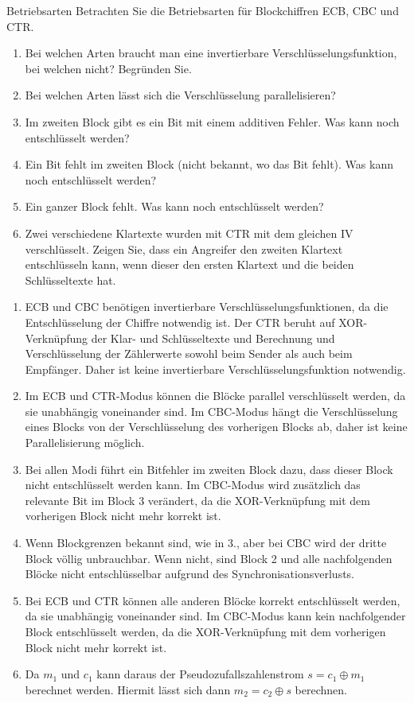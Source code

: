 \documentclass{article}
\begin{document}
\begin{exercise}{Betriebsarten}
  Betrachten Sie die Betriebsarten für Blockchiffren ECB, CBC und CTR.

  \begin{enumerate}
    \item Bei welchen Arten braucht man eine invertierbare Verschlüsselungsfunktion, bei welchen nicht? Begründen Sie.
    \item Bei welchen Arten lässt sich die Verschlüsselung parallelisieren?
    \item Im zweiten Block gibt es ein Bit mit einem additiven Fehler. Was kann noch entschlüsselt werden?
    \item Ein Bit fehlt im zweiten Block (nicht bekannt, wo das Bit fehlt). Was kann noch entschlüsselt werden?
    \item Ein ganzer Block fehlt. Was kann noch entschlüsselt werden?
    \item Zwei verschiedene Klartexte wurden mit CTR mit dem gleichen IV verschlüsselt. Zeigen Sie, dass ein Angreifer den zweiten Klartext entschlüsseln kann, wenn dieser den ersten Klartext und die beiden Schlüsseltexte hat.
  \end{enumerate}

  \begin{solution}
    \begin{enumerate}
        \item ECB und CBC benötigen invertierbare Verschlüsselungsfunktionen, da die Entschlüsselung der Chiffre notwendig ist. Der CTR beruht auf XOR-Verknüpfung der Klar- und Schlüsseltexte und Berechnung und Verschlüsselung der Zählerwerte sowohl beim Sender als auch beim Empfänger. Daher ist keine invertierbare Verschlüsselungsfunktion notwendig.
        \item Im ECB und CTR-Modus können die Blöcke parallel verschlüsselt werden, da sie unabhängig voneinander sind. Im CBC-Modus hängt die Verschlüsselung eines Blocks von der Verschlüsselung des vorherigen Blocks ab, daher ist keine Parallelisierung möglich.
        \item Bei allen Modi führt ein Bitfehler im zweiten Block dazu, dass dieser Block nicht entschlüsselt werden kann. Im CBC-Modus wird zusätzlich das relevante Bit im Block 3 verändert, da die XOR-Verknüpfung mit dem vorherigen Block nicht mehr korrekt ist.
        \item Wenn Blockgrenzen bekannt sind, wie in 3., aber bei CBC wird der dritte Block völlig unbrauchbar. Wenn nicht, sind Block 2 und alle nachfolgenden Blöcke nicht entschlüsselbar aufgrund des Synchronisationsverlusts.
        \item Bei ECB und CTR können alle anderen Blöcke korrekt entschlüsselt werden, da sie unabhängig voneinander sind. Im CBC-Modus kann kein nachfolgender Block entschlüsselt werden, da die XOR-Verknüpfung mit dem vorherigen Block nicht mehr korrekt ist.
        \item Da $m_1$ und $c_1$ kann daraus der Pseudozufallszahlenstrom $s=c_1\oplus m_1$ berechnet werden. Hiermit lässt sich dann $m_2=c_2\oplus s$ berechnen.
    \end{enumerate}
  \end{solution}
\end{exercise}
\end{document}
